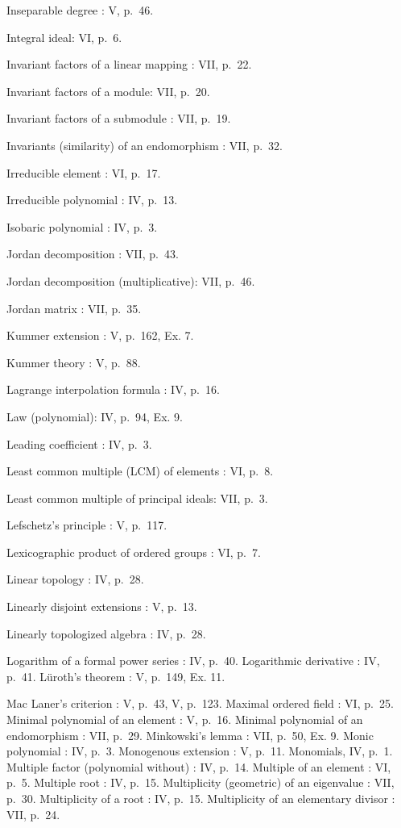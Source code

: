 Inseparable degree : V, p.~46.

Integral ideal: VI, p.~6.

Invariant factors of a linear mapping : VII, p.~22.

Invariant factors of a module: VII, p.~20.

Invariant factors of a submodule : VII, p.~19.

Invariants (similarity) of an endomorphism : VII, p.~32.

Irreducible element : VI, p.~17.

Irreducible polynomial : IV, p.~13.

Isobaric polynomial : IV, p.~3.

Jordan decomposition : VII, p.~43.

Jordan decomposition (multiplicative): VII, p.~46.

Jordan matrix : VII, p.~35.

Kummer extension : V, p.~162, Ex. 7.

Kummer theory : V, p.~88.

Lagrange interpolation formula : IV, p.~16.

Law (polynomial): IV, p.~94, Ex. 9.

Leading coefficient : IV, p.~3.

Least common multiple (LCM) of elements : VI, p.~8.

Least common multiple of principal ideals: VII, p.~3.

Lefschetz's principle : V, p.~117.

Lexicographic product of ordered groups : VI, p.~7.

Linear topology : IV, p.~28.

Linearly disjoint extensions : V, p.~13.

Linearly topologized algebra : IV, p.~28.

Logarithm of a formal power series : IV, p.~40. Logarithmic derivative : IV, p.~41. Lüroth's theorem : V, p.~149, Ex. 11.

Mac Laner's criterion : V, p.~43, V, p.~123. Maximal ordered field : VI, p.~25. Minimal polynomial of an element : V, p.~16. Minimal polynomial of an endomorphism : VII, p.~29. Minkowski's lemma : VII, p.~50, Ex. 9. Monic polynomial : IV, p.~3. Monogenous extension : V, p.~11. Monomials, IV, p.~1. Multiple factor (polynomial without) : IV, p.~14. Multiple of an element : VI, p.~5. Multiple root : IV, p.~15. Multiplicity (geometric) of an eigenvalue : VII, p.~30. Multiplicity of a root : IV, p.~15. Multiplicity of an elementary divisor : VII, p.~24.


